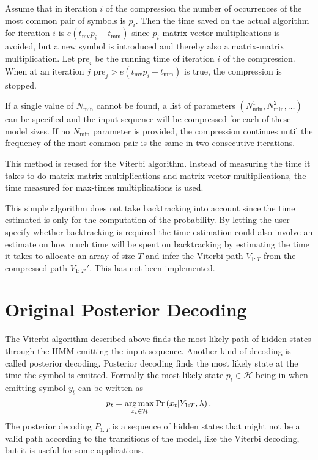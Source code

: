 Assume that in iteration $i$ of the compression the number of occurrences
of the most common pair of symbols is $p_i$. Then the time saved on the actual
algorithm for iteration $i$ is $e (t_{\text{mv}} p_i - t_{\text{mm}})$ since
$p_i$ matrix-vector multiplications is avoided, but a new symbol is introduced
and thereby also a matrix-matrix multiplication. Let $\text{pre}_i$ be the running
time of iteration $i$ of the compression. When at an iteration $j$
$\text{pre}_j > e (t_{\text{mv}} p_i - t_{\text{mm}})$ is true, the compression is
stopped.

If a single value of
$N_{\text{min}}$ cannot be found, a list of parameters
$(N_{\text{min}}^1, N_{\text{min}}^2, \dots)$ can be specified and the input
sequence will be compressed for each of these model sizes. If no
$N_{\text{min}}$ parameter is provided, the compression continues until the
frequency of the most common pair is the same in two consecutive iterations.

This method is reused for the Viterbi algorithm. Instead of measuring the
time it takes to do matrix-matrix multiplications and matrix-vector
multiplications, the time measured for max-times multiplications is used.

This simple algorithm does not take backtracking into account since the time
estimated is only for the computation of the probability. By letting the user
specify whether backtracking is required the time estimation could also
involve an estimate on how much time will be spent on backtracking by
estimating the time it takes to allocate an array of size $T$ and
infer the Viterbi path $V_{1:T}$ from the compressed path $V_{1:T'}'$. This has
not been implemented.

\section{Original Posterior Decoding}
\label{sec:posterior-decoding-1}

The Viterbi algorithm described above finds the most likely path of hidden
states through the HMM emitting the input sequence. Another kind of decoding is
called posterior decoding. Posterior decoding finds the most likely state at
the time the symbol is emitted. Formally the most likely state
$p_t \in \mathcal{H}$ being in when emitting symbol $y_t$ can be written as
\begin{equation*}
  p_t = \operatorname*{arg\,max}_{x_t \in \mathcal{H}} \Pr \left(x_t | Y_{1:T}, \lambda \right).
\end{equation*}
The posterior decoding $P_{1:T}$ is a sequence of hidden states that might not
be a valid path according to the transitions of the model, like the Viterbi
decoding, but it is useful for some applications.

